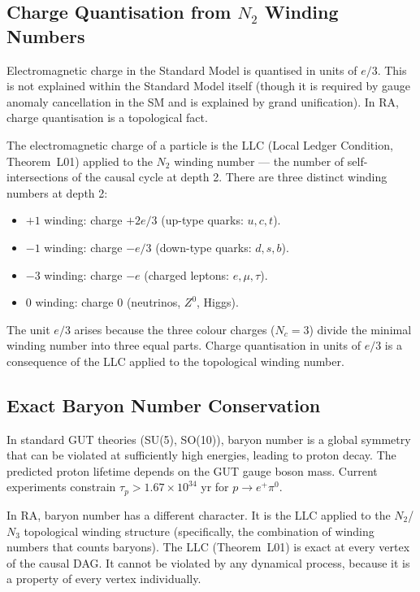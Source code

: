 \documentclass[12pt,a4paper]{article}
\begin{document}
\subsection{Charge Quantisation from $N_2$ Winding Numbers}

Electromagnetic charge in the Standard Model is quantised in units of $e/3$.  This is not explained within the Standard Model itself (though it is required by gauge anomaly cancellation in the SM and is explained by grand unification).  In RA, charge quantisation is a topological fact.

The electromagnetic charge of a particle is the LLC (Local Ledger Condition, Theorem~L01) applied to the $N_2$ winding number --- the number of self-intersections of the causal cycle at depth 2.  There are three distinct winding numbers at depth 2:
\begin{itemize}
  \item $+1$ winding: charge $+2e/3$ (up-type quarks: $u,c,t$).
  \item $-1$ winding: charge $-e/3$ (down-type quarks: $d,s,b$).
  \item $-3$ winding: charge $-e$ (charged leptons: $e,\mu,\tau$).
  \item $0$ winding: charge $0$ (neutrinos, $Z^0$, Higgs).
\end{itemize}
The unit $e/3$ arises because the three colour charges ($N_c=3$) divide the minimal winding number into three equal parts.  Charge quantisation in units of $e/3$ is a consequence of the LLC applied to the topological winding number.

\subsection{Exact Baryon Number Conservation}

In standard GUT theories (SU(5), SO(10)), baryon number is a global symmetry that can be violated at sufficiently high energies, leading to proton decay.  The predicted proton lifetime depends on the GUT gauge boson mass.  Current experiments constrain $\tau_p>1.67\times10^{34}$ yr for $p\to e^+\pi^0$.

In RA, baryon number has a different character.  It is the LLC applied to the $N_2$/$N_3$ topological winding structure (specifically, the combination of winding numbers that counts baryons).  The LLC (Theorem~L01) is exact at every vertex of the causal DAG.  It cannot be violated by any dynamical process, because it is a property of every vertex individually.
\end{document}
